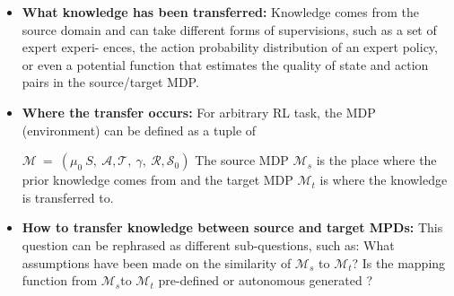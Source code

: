 \documentclass[letterpaper%
, oneside%
, 12pt%
,thesepararticles%
, english%
,creativecommons,hyperref, withAlgo2e%
]{thETS}
\begin{document}
\begin{itemize}
\item \textbf{What knowledge has been transferred: }Knowledge comes from the source domain and can take different forms of supervisions, such as a set of expert experi- ences, the action probability distribution of an expert policy, or even a potential function that estimates the quality of state and action pairs in the source/target MDP. 
\item \textbf{Where the transfer occurs: }For arbitrary RL task, the MDP (environment) can be defined as a tuple of

$\displaystyle \mathcal{M} \ =\ ( \mu _{0} \ S,\ \mathcal{A} ,\mathcal{T} ,\ \gamma ,\ \mathcal{R} ,\mathcal{S}_{0})$ The source MDP $\displaystyle \mathcal{M}_{s}$ is the place where the prior knowledge comes from and the target MDP $\displaystyle \mathcal{M}_{t}$ is where the knowledge is transferred to. 
\item \textbf{How to transfer knowledge between source and target MPDs:} This question can be rephrased as different sub-questions, such as: What assumptions have been made on the similarity of $\displaystyle \mathcal{M}_{s}$ to $\displaystyle \mathcal{M}_{t}$? Is the mapping function from $\displaystyle \mathcal{M}_{s}$to $\displaystyle \mathcal{M}_{t}$ pre-defined or autonomous generated ? 


\end{itemize}
\end{document}
